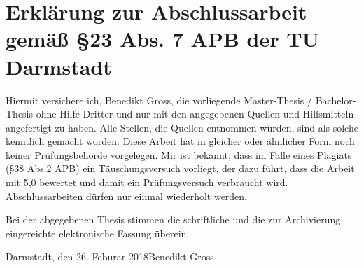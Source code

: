 \chapter*{Erkl\"arung zur Abschlussarbeit gem\"aß \S 23 Abs. 7 APB der TU Darmstadt}

Hiermit versichere ich, Benedikt Gross, die vorliegende Master-Thesis / Bachelor-Thesis ohne Hilfe Dritter und nur mit den angegebenen Quellen und Hilfsmitteln angefertigt zu haben. Alle Stellen, die Quellen entnommen wurden, sind als solche kenntlich gemacht worden. Diese Arbeit hat in gleicher oder \"ahnlicher Form noch keiner Pr\"ufungsbeh\"orde vorgelegen.  
Mir ist bekannt, dass im Falle eines Plagiats (\S 38 Abs.2 APB) ein T\"auschungsversuch vorliegt, der dazu f\"uhrt, dass die Arbeit mit 5,0 bewertet und damit ein Pr\"ufungsversuch verbraucht wird. Abschlussarbeiten d\"urfen nur einmal wiederholt werden.
	
Bei der abgegebenen Thesis stimmen die schriftliche und die zur Archivierung eingereichte elektronische Fassung \"uberein. 
	
\vspace{1.5cm}
	
\noindent Darmstadt, den 26. Feburar 2018\hfill Benedikt Gross